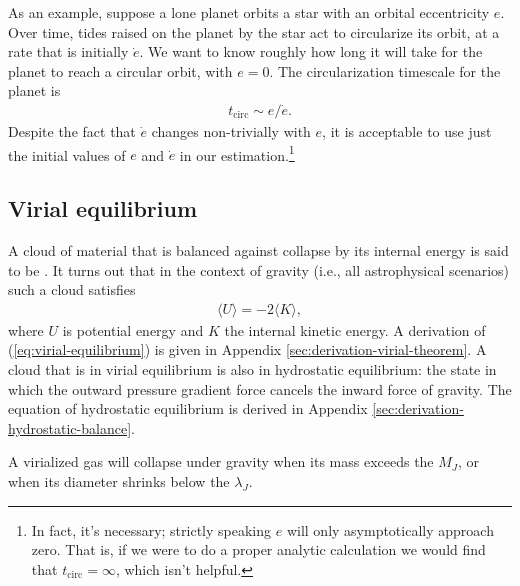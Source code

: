 As an example, suppose a lone planet orbits a star with an orbital eccentricity $e$. Over time, tides raised on the planet by the star act to circularize its orbit, at a rate that is initially $\dot{e}$. We want to know roughly how long it will take for the planet to reach a circular orbit, with $e = 0$. The circularization timescale for the planet is
\begin{align}
    t_\text{circ} \sim e / \dot{e}.
\end{align}
Despite the fact that $\dot{e}$ changes non-trivially with $e$, it is acceptable to use just the initial values of $e$ and $\dot{e}$ in our estimation.\footnote{In fact, it's necessary; strictly speaking $e$ will only asymptotically approach zero. That is, if we were to do a proper analytic calculation we would find that $t_\text{circ} = \infty$, which isn't helpful.}

\subsection{Virial equilibrium}
A cloud of material that is balanced against collapse by its internal energy is said to be . It turns out that in the context of gravity (i.e., all astrophysical scenarios) such a cloud satisfies
\begin{align} \label{eq:virial-equilibrium}
    \langle U \rangle = -2\langle K \rangle,
\end{align}
where $U$ is potential energy and $K$ the internal kinetic energy. A derivation of (\ref{eq:virial-equilibrium}) is given in Appendix \ref{sec:derivation-virial-theorem}. A cloud that is in virial equilibrium is also in hydrostatic equilibrium: the state in which the outward pressure gradient force cancels the inward force of gravity. The equation of hydrostatic equilibrium is derived in Appendix \ref{sec:derivation-hydrostatic-balance}.

A virialized gas will collapse under gravity when its mass exceeds the  $M_J$, or when its diameter shrinks below the  $\lambda_J$.
